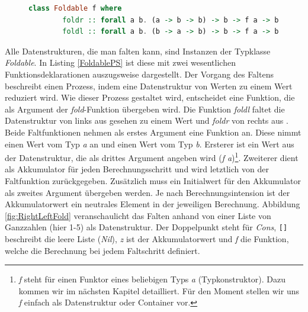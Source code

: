 \documentclass[
12pt,
ngerman,
oneside]
{scrbook} %
\begin{document}
\begin{figure}
	\begin{lstlisting}[aboveskip=-1em, language=purescript, caption=Typklasse Foldable, label=FoldablePS]
	class Foldable f where
		foldr :: forall a b. (a -> b -> b) -> b -> f a -> b
		foldl :: forall a b. (b -> a -> b) -> b -> f a -> b
	\end{lstlisting}
\end{figure}

Alle Datenstrukturen, die man falten kann, sind Instanzen der Typklasse \emph{Foldable}. In Listing \ref{FoldablePS} ist diese mit zwei wesentlichen Funktionsdeklarationen auszugsweise dargestellt. Der Vorgang des Faltens beschreibt einen Prozess, indem eine Datenstruktur von Werten zu einem Wert reduziert wird. Wie dieser Prozess gestaltet wird, entscheidet eine Funktion, die als Argument der \emph{fold}-Funktion übergeben wird. Die Funktion \emph{foldl} faltet die Datenstruktur von links aus gesehen zu einem Wert und \emph{foldr} von rechts aus \cites{HaskellWikiFold18}[][S. 40--42]{Freeman17}. Beide Faltfunktionen nehmen als erstes Argument eine Funktion an. Diese nimmt einen Wert vom Typ \emph{a} an und einen Wert vom Typ \emph{b}. Ersterer ist ein Wert aus der Datenstruktur, die als drittes Argument angeben wird (\emph{f a})\footnote{\emph{f} steht für einen Funktor eines beliebigen Typs \emph{a} (Typkonstruktor). Dazu kommen wir im nächsten Kapitel detailliert. Für den Moment stellen wir uns \emph{f} einfach als Datenstruktur oder Container vor.}. Zweiterer dient als Akkumulator für jeden Berechnungsschritt und wird letztlich von der Faltfunktion zurückgegeben. Zusätzlich muss ein Initialwert für den Akkumulator als zweites Argument übergeben werden. Je nach Berechnungsintension ist der Akkumulatorwert ein neutrales Element in der jeweiligen Berechnung. Abbildung \ref{fig:RightLeftFold} veranschaulicht das Falten anhand von einer Liste von Ganzzahlen (hier 1-5) als Datenstruktur. Der Doppelpunkt steht für \emph{Cons}, \lstinline[language=purescript, columns=fixed]{[]} beschreibt die leere Liste (\emph{Nil}), \emph{z} ist der Akkumulatorwert und \emph{f} die Funktion, welche die Berechnung bei jedem Faltschritt definiert.
\end{document}
